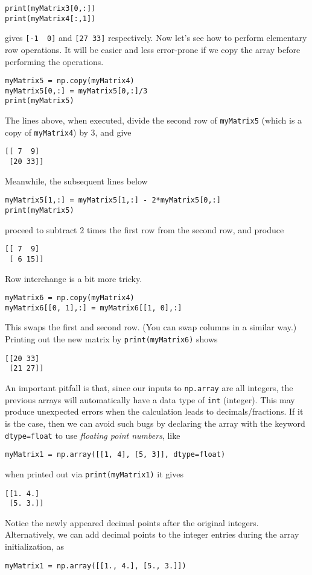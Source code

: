 \begin{lstlisting}
print(myMatrix3[0,:])
print(myMatrix4[:,1])
\end{lstlisting}
gives
\verb|[-1  0]| and \verb|[27 33]| respectively. Now let's see how to perform elementary row operations. It will be easier and less error-prone if we copy the array before performing the operations.
\begin{lstlisting}
myMatrix5 = np.copy(myMatrix4)
myMatrix5[0,:] = myMatrix5[0,:]/3
print(myMatrix5)
\end{lstlisting}
The lines above, when executed, divide the second row of \verb|myMatrix5| (which is a copy of \verb|myMatrix4|) by $3$, and give
\begin{lstlisting}
[[ 7  9]
 [20 33]]    
\end{lstlisting}
Meanwhile, the subsequent lines below
\begin{lstlisting}
myMatrix5[1,:] = myMatrix5[1,:] - 2*myMatrix5[0,:]
print(myMatrix5)
\end{lstlisting}
proceed to subtract $2$ times the first row from the second row, and produce
\begin{lstlisting}
[[ 7  9]
 [ 6 15]]
\end{lstlisting}
Row interchange is a bit more tricky.
\begin{lstlisting}
myMatrix6 = np.copy(myMatrix4)
myMatrix6[[0, 1],:] = myMatrix6[[1, 0],:]    
\end{lstlisting}
This swaps the first and second row. (You can swap columns in a similar way.) Printing out the new matrix by \verb|print(myMatrix6)| shows
\begin{lstlisting}
[[20 33]
 [21 27]]
\end{lstlisting}
An important pitfall is that, since our inputs to \texttt{np.array} are all integers, the previous arrays will automatically have a data type of \texttt{int} (integer). This may produce unexpected errors when the calculation leads to decimals/fractions. If it is the case, then we can avoid such bugs by declaring the array with the keyword \verb|dtype=float| to use \textit{floating point numbers}, like
\begin{lstlisting}
myMatrix1 = np.array([[1, 4], [5, 3]], dtype=float) 
\end{lstlisting}
when printed out via \verb|print(myMatrix1)| it gives
\begin{lstlisting}
[[1. 4.]
 [5. 3.]]    
\end{lstlisting}
Notice the newly appeared decimal points after the original integers. Alternatively, we can add decimal points to the integer entries during the array initialization, as
\begin{lstlisting}
myMatrix1 = np.array([[1., 4.], [5., 3.]]) 
\end{lstlisting}

